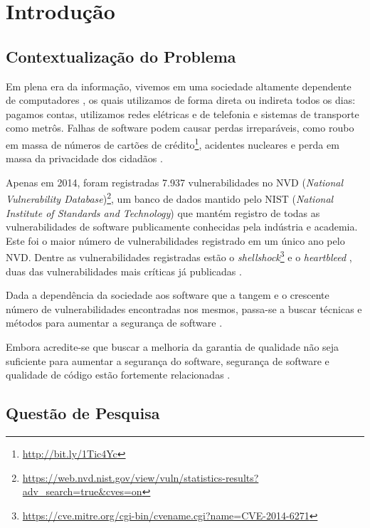 \chapter*{Introdução} \label{introducao}

\section*{Contextualização do Problema}

Em plena era da informação, vivemos em uma sociedade altamente dependente de computadores \cite{inclusao}, os quais utilizamos de forma direta ou indireta todos os dias: pagamos contas, utilizamos redes elétricas e de telefonia e sistemas de transporte como metrôs.  Falhas de software podem causar perdas irreparáveis, como roubo em massa de números de cartões de crédito\footnote{\url{http://bit.ly/1Tic4Yc}}, acidentes nucleares \cite{stuxnet} e perda em massa da privacidade dos cidadãos \cite{snowden}.

Apenas em 2014, foram registradas 7.937 vulnerabilidades no NVD (\textit{National Vulnerability Database})\footnote{\url{https://web.nvd.nist.gov/view/vuln/statistics-results?adv_search=true&cves=on}}, um banco de dados mantido pelo NIST (\textit{National Institute of Standards and Technology}) que mantém registro de todas as vulnerabilidades de software publicamente conhecidas pela indústria e academia. Este foi o maior número de vulnerabilidades registrado em um único ano pelo NVD. Dentre as vulnerabilidades registradas estão o \textit{shellshock}\footnote{\url{https://cve.mitre.org/cgi-bin/cvename.cgi?name=CVE-2014-6271}} e o \textit{heartbleed} \cite{heartbleed}, duas das vulnerabilidades mais críticas já publicadas \cite{heartbleed}.

Dada a dependência da sociedade aos software que a tangem e o crescente número de vulnerabilidades encontradas nos mesmos, passa-se a buscar técnicas e métodos para aumentar a segurança de software \cite{sociedade}.

Embora acredite-se que buscar a melhoria da garantia de qualidade não seja suficiente para aumentar a segurança do software, segurança de software e qualidade de código estão fortemente relacionadas \cite{secure_programming}.

\section*{Questão de Pesquisa}

